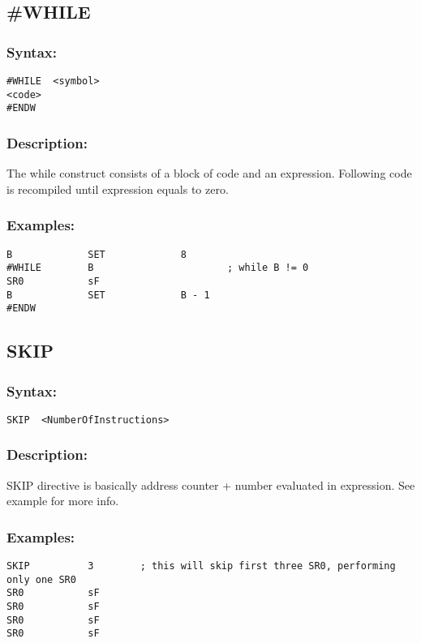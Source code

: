     \subsection{\#WHILE}
        \subsubsection{Syntax:}
        {
            \usecodefont
            \verb'#WHILE  <symbol>'\\
            \verb'<code>'\\
            \verb'#ENDW'
        }

        \subsubsection{Description:}
            The while construct consists of a block of code and an expression. Following code is recompiled until expression equals to zero.

        \subsubsection{Examples:}
        {
            \usecodefont
            \verb'B             SET             8'\\
            \verb'#WHILE        B                       ; while B != 0'\\
            \verb'SR0           sF'\\
            \verb'B             SET             B - 1'\\
            \verb'#ENDW'
        }

    \subsection{SKIP}
        \subsubsection{Syntax:}
        {
            \usecodefont
            \verb'SKIP  <NumberOfInstructions>'
        }
        \subsubsection{Description:}
            SKIP directive is basically address counter + number evaluated in expression. See example for more info.

        \subsubsection{Examples:}
        {
            \usecodefont
            \verb'SKIP          3        ; this will skip first three SR0, performing only one SR0'\\
            \verb'SR0           sF'\\
            \verb'SR0           sF'\\
            \verb'SR0           sF'\\
            \verb'SR0           sF'\\
        }

